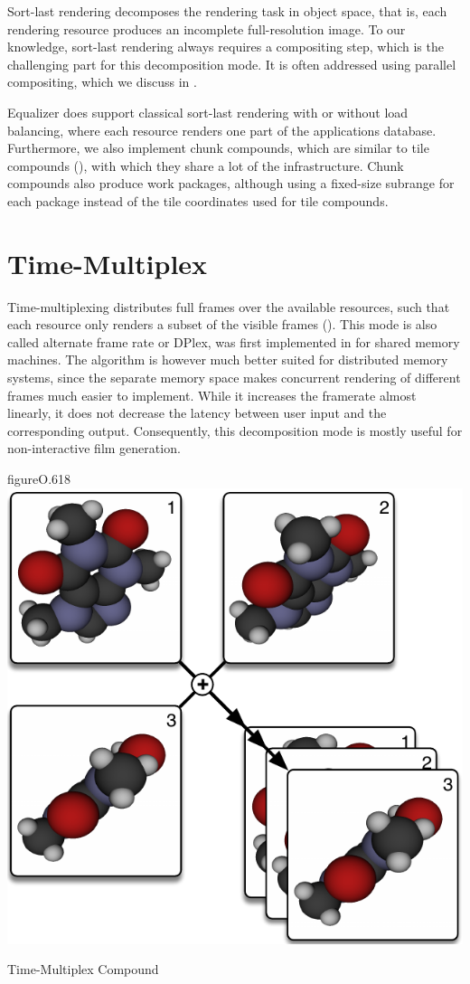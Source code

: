 Sort-last rendering decomposes the rendering task in object space, that is,
each rendering resource produces an incomplete full-resolution image. To our
knowledge, sort-last rendering always requires a compositing step, which is the
challenging part for this decomposition mode. It is often addressed using
parallel compositing, which we discuss in .

Equalizer does support classical sort-last rendering with or without
load balancing, where each resource renders one part of the applications
database. Furthermore, we also implement chunk compounds, which are similar to
tile compounds (), with which they share a lot of the
infrastructure. Chunk compounds also produce work packages, although using a
fixed-size subrange for each package instead of the tile coordinates used for
tile compounds.

\section{Time-Multiplex}

Time-multiplexing distributes full frames over the available resources, such
that each resource only renders a subset of the visible frames ().
This mode is also called alternate frame rate or DPlex, was first implemented in
\cite{BRE:05} for shared memory machines. The algorithm is however much better
suited for distributed memory systems, since the separate memory space makes
concurrent rendering of different frames much easier to implement. While it
increases the framerate almost linearly, it does not decrease the latency
between user input and the corresponding output. Consequently, this
decomposition mode is mostly useful for non-interactive film generation.

\begin{wrapfloat}{figure}{O}{.618\textwidth}
\includegraphics[width=.618\textwidth]{images/DPlex}
{\caption{\label{fDPlex}Time-Multiplex Compound}}
\end{wrapfloat}

